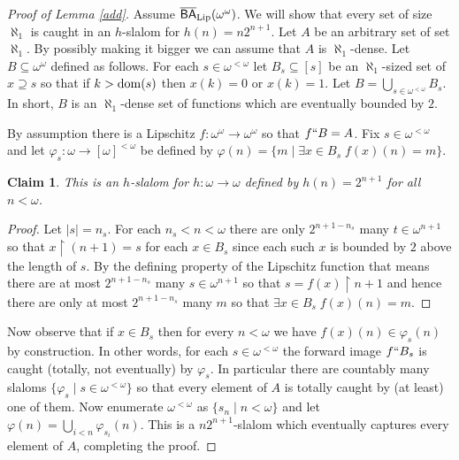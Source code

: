 \documentclass[leqno,11pt]{amsart}
\newtheorem{claim}[theorem]{Claim}
\theoremstyle{definition}
\theoremstyle{remark}
\def\hook{\upharpoonright}
\def\BA{\mathsf{BA}}
\def\baire{\omega^\omega}
\begin{document}
\begin{proof}[Proof of Lemma \ref{add}]
    Assume $\overline{\BA}_{\rm Lip}(\baire)$. We will show that every set of size $\aleph_1$ is caught in an $h$-slalom for $h(n) = n2^{n+1}$. Let $A$ be an arbitrary set of set $\aleph_1$. By possibly making it bigger we can assume that $A$ is $\aleph_1$-dense. %
    Let $B \subseteq \baire$ defined as follows. For each $s \in \omega^{<\omega}$ let $B_s \subseteq [s]$ be an $\aleph_1$-sized set of $x \supseteq s$ so that if $k > {\rm dom}(s)$ then $x(k) = 0$ or $x(k) = 1$. Let $B = \bigcup_{s \in \omega^{<\omega}} B_s$. In short, $B$ is an $\aleph_1$-dense set of functions which are eventually bounded by $2$.

    By assumption there is a Lipschitz $f:\baire \to \baire$ so that $f``B = A$. Fix $s \in \omega^{<\omega}$ and let $\varphi_s:\omega \to [\omega]^{<\omega}$ be defined by $\varphi(n) = \{m \; | \; \exists x \in B_{s} \; f(x)(n) = m\}$. 

    \begin{claim}
        This is an $h$-slalom for $h:\omega \to \omega$ defined by $h(n) = 2^{n+1}$ for all $n < \omega$.
    \end{claim}

    \begin{proof}
        Let $|s| = n_s$. For each $n_s < n < \omega$ there are only $2^{n+1 - n_s}$ many $t \in \omega^{n+1}$ so that $x \hook (n+1) = s$ for each $x \in B_{s}$ since each such $x$ is bounded by $2$ above the length of $s$. By the defining property of the Lipschitz function that means there are at most $2^{n+1 - n_s}$ many $s \in \omega^{n+1}$ so that $s = f(x) \hook n+1$ and hence there are only at most $2^{n+1 - n_s}$ many $m$ so that $\exists x \in B_{s} \; f(x)(n) = m$.
    \end{proof}
    
Now observe that if $x \in B_{s}$ then for every $n < \omega$ we have $f(x)(n) \in \varphi_s(n)$ by construction. In other words, for each $s \in \omega^{<\omega}$ the forward image $f``B_s$ is caught (totally, not eventually) by $\varphi_s$. In particular there are countably many slaloms $\{\varphi_s\; | \; s \in \omega^{<\omega}\}$ so that every element of $A$ is totally caught by (at least) one of them. Now enumerate $\omega^{<\omega}$ as $\{s_n\; | \; n < \omega\}$ and let $\varphi ( n) =\bigcup_{i < n} \varphi_{s_i} (n)$. This is a $n2^{n+1}$-slalom which eventually captures every element of $A$, completing the proof.    
\end{proof}
\end{document}
